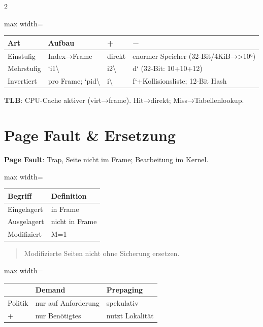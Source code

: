 \documentclass[10pt, a4paper]{article}
\begin{document}
\begin{multicols}{2}
{\small
\begin{adjustbox}{max width=\linewidth}
{\scriptsize
\begin{tabular}{llll}
\toprule
\textbf{Art} & \textbf{Aufbau} & \textbf{+} & \textbf{−} \\
\midrule
Einstufig & Index→Frame & direkt & enormer Speicher (32-Bit/4KiB→>10⁶) \\
Mehrstufig & `i1\textbackslash{} & i2\textbackslash{} & d` (32-Bit: 10+10+12) \\
Invertiert & pro Frame; `pid\textbackslash{} & i\textbackslash{} & f`+Kollisionsliste; 12-Bit Hash \\
\bottomrule
\end{tabular}
}
\end{adjustbox}
}


\textbf{TLB}: CPU-Cache aktiver (virt→frame). Hit→direkt; Miss→Tabellenlookup.



\section{Page Fault \& Ersetzung}

\textbf{Page Fault}: Trap, Seite nicht im Frame; Bearbeitung im Kernel.



{\small
\begin{adjustbox}{max width=\linewidth}
{\scriptsize
\begin{tabular}{ll}
\toprule
\textbf{Begriff} & \textbf{Definition} \\
\midrule
Eingelagert & in Frame \\
Ausgelagert & nicht in Frame \\
Modifiziert & M=1 \\
\bottomrule
\end{tabular}
}
\end{adjustbox}
}


\begin{quote}
Modifizierte Seiten nicht ohne Sicherung ersetzen.
\end{quote}


{\small
\begin{adjustbox}{max width=\linewidth}
{\scriptsize
\begin{tabular}{lll}
\toprule
\textbf{} & \textbf{Demand} & \textbf{Prepaging} \\
\midrule
Politik & nur auf Anforderung & spekulativ \\
+ & nur Benötigtes & nutzt Lokalität \\
\bottomrule
\end{tabular}
}
\end{adjustbox}
}



\end{multicols}
\end{document}

